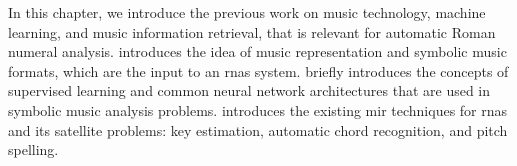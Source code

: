 

In this chapter, we introduce the previous work on music
technology, machine learning, and music information
retrieval, that is relevant for automatic Roman numeral
analysis.  introduces the idea
of music representation and symbolic music formats, which
are the input to an \glspl{rna} system.
 briefly introduces the concepts
of supervised learning and common neural network
architectures that are used in symbolic music analysis
problems.  introduces the
existing \gls{mir} techniques for \glspl{rna}
and its satellite problems: key estimation, automatic chord
recognition, and pitch spelling.
